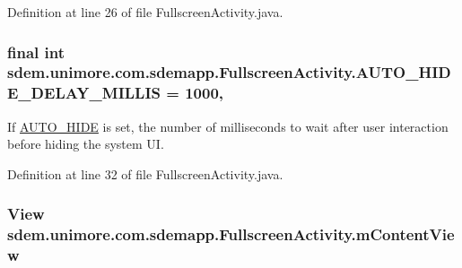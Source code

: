Definition at line 26 of file Fullscreen\+Activity.\+java.

\hypertarget{classsdem_1_1unimore_1_1com_1_1sdemapp_1_1_fullscreen_activity_af3d1d9220a43ad429f99d5aafff51584}{
\subsubsection[{A\+U\+T\+O\+\_\+\+H\+I\+D\+E\+\_\+\+D\+E\+L\+A\+Y\+\_\+\+M\+I\+L\+L\+I\+S}]{\setlength{\rightskip}{0pt plus 5cm}final int sdem.\+unimore.\+com.\+sdemapp.\+Fullscreen\+Activity.\+A\+U\+T\+O\+\_\+\+H\+I\+D\+E\+\_\+\+D\+E\+L\+A\+Y\+\_\+\+M\+I\+L\+L\+I\+S = 1000\hspace{0.3cm}{\ttfamily [static]}, {\ttfamily [private]}}}\label{classsdem_1_1unimore_1_1com_1_1sdemapp_1_1_fullscreen_activity_af3d1d9220a43ad429f99d5aafff51584}
If \hyperlink{classsdem_1_1unimore_1_1com_1_1sdemapp_1_1_fullscreen_activity_a3befdb5b9ed48acbcdcf233e5b4f83f6}{A\+U\+T\+O\+\_\+\+H\+I\+D\+E} is set, the number of milliseconds to wait after user interaction before hiding the system U\+I. 

Definition at line 32 of file Fullscreen\+Activity.\+java.

\hypertarget{classsdem_1_1unimore_1_1com_1_1sdemapp_1_1_fullscreen_activity_a16c3f7ad16b7cb1e5edd2fb951bca41f}{
\subsubsection[{m\+Content\+View}]{\setlength{\rightskip}{0pt plus 5cm}View sdem.\+unimore.\+com.\+sdemapp.\+Fullscreen\+Activity.\+m\+Content\+View\hspace{0.3cm}{\ttfamily [private]}}}\label{classsdem_1_1unimore_1_1com_1_1sdemapp_1_1_fullscreen_activity_a16c3f7ad16b7cb1e5edd2fb951bca41f}


